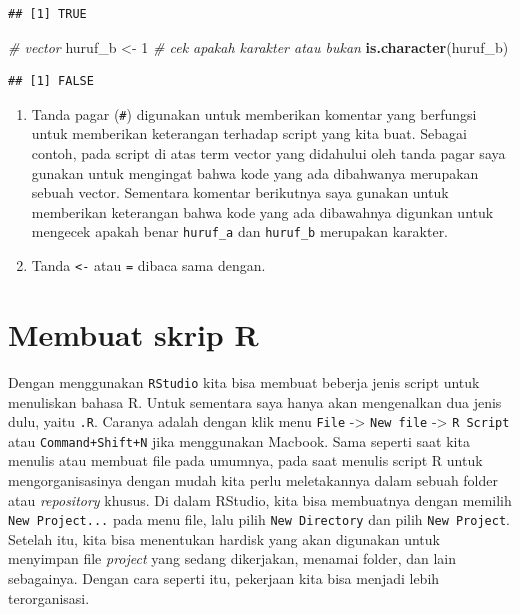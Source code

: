\documentclass[]{book}
\newenvironment{Shaded}{\begin{snugshade}}{\end{snugshade}}
\newcommand{\CommentTok}[1]{\textcolor[rgb]{0.56,0.35,0.01}{\textit{#1}}}
\newcommand{\DecValTok}[1]{\textcolor[rgb]{0.00,0.00,0.81}{#1}}
\newcommand{\KeywordTok}[1]{\textcolor[rgb]{0.13,0.29,0.53}{\textbf{#1}}}
\newcommand{\NormalTok}[1]{#1}
\newcommand{\StringTok}[1]{\textcolor[rgb]{0.31,0.60,0.02}{#1}}
\begin{document}
\begin{verbatim}
## [1] TRUE
\end{verbatim}

\begin{Shaded}
\begin{Highlighting}[]
\CommentTok{# vector}
\NormalTok{huruf_b <-}\StringTok{ }\DecValTok{1}
\CommentTok{# cek apakah karakter atau bukan}
\KeywordTok{is.character}\NormalTok{(huruf_b)}
\end{Highlighting}
\end{Shaded}

\begin{verbatim}
## [1] FALSE
\end{verbatim}

\begin{enumerate}
\def\labelenumi{\arabic{enumi}.}
\setcounter{enumi}{1}
\item
  Tanda pagar (\texttt{\#}) digunakan untuk memberikan komentar yang
  berfungsi untuk memberikan keterangan terhadap script yang kita buat.
  Sebagai contoh, pada script di atas term vector yang didahului oleh
  tanda pagar saya gunakan untuk mengingat bahwa kode yang ada
  dibahwanya merupakan sebuah vector. Sementara komentar berikutnya saya
  gunakan untuk memberikan keterangan bahwa kode yang ada dibawahnya
  digunkan untuk mengecek apakah benar \texttt{huruf\_a} dan
  \texttt{huruf\_b} merupakan karakter.
\item
  Tanda \texttt{\textless{}-} atau \texttt{=} dibaca sama dengan.
\end{enumerate}

\hypertarget{membuat-skrip-r}{%
\section{Membuat skrip R}\label{membuat-skrip-r}}

Dengan menggunakan \texttt{RStudio} kita bisa membuat beberja jenis
script untuk menuliskan bahasa R. Untuk sementara saya hanya akan
mengenalkan dua jenis dulu, yaitu \texttt{.R}. Caranya adalah dengan
klik menu \texttt{File} -\textgreater{} \texttt{New\ file}
-\textgreater{} \texttt{R\ Script} atau \texttt{Command+Shift+N} jika
menggunakan Macbook. Sama seperti saat kita menulis atau membuat file
pada umumnya, pada saat menulis script R untuk mengorganisasinya dengan
mudah kita perlu meletakannya dalam sebuah folder atau \emph{repository}
khusus. Di dalam RStudio, kita bisa membuatnya dengan memilih
\texttt{New\ Project...} pada menu file, lalu pilih
\texttt{New\ Directory} dan pilih \texttt{New\ Project}. Setelah itu,
kita bisa menentukan hardisk yang akan digunakan untuk menyimpan file
\emph{project} yang sedang dikerjakan, menamai folder, dan lain
sebagainya. Dengan cara seperti itu, pekerjaan kita bisa menjadi lebih
terorganisasi.
\end{document}
